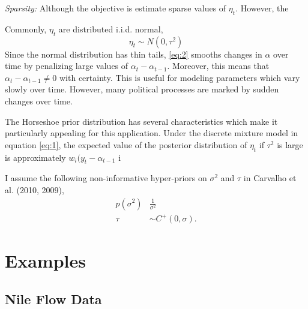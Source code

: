 \documentclass{article}
\begin{document}
\textit{Sparsity:} Although the objective is estimate sparse values of $\eta_{t}$. However, the 

Commonly, $\eta_{t}$ are distributed i.i.d. normal,
\begin{equation}
  \label{eq:2}
  \eta_{t} \sim N(0, \tau^{2})
\end{equation}
Since the normal distribution has thin tails, \eqref{eq:2} smooths changes in $\alpha$ over time by penalizing large values of $\alpha_{t} - \alpha_{t-1}$.
Moreover, this means that $\alpha_{t} - \alpha_{t-1} \neq 0$ with certainty.
This is useful for modeling parameters which vary slowly over time.
However, many political processes are marked by sudden changes over time.


The Horseshoe prior distribution has several characteristics which make it particularly appealing for this application.
Under the discrete mixture model in equation \eqref{eq:1}, the expected value of the posterior distribution of $\eta_{t}$ if $\tau^{2}$ is large is approximately $w_{i} (y_{t} - \alpha_{t-1}$ i
\begin{equation}
  \label{eq:18}
\end{equation}

I assume the following non-informative hyper-priors on $\sigma^{2}$ and $\tau$ in Carvalho et al. (2010, 2009),
\begin{align}
  \label{eq:9}
  p(\sigma^{2}) & \frac{1}{\sigma^{2}}  \\
  \label{eq:11}
  \tau &\sim C^{+}(0, \sigma) \text{.}
\end{align}

\section{Examples}
\label{sec:examples}

\subsection{Nile Flow Data}
\label{sec:nile}
\end{document}

